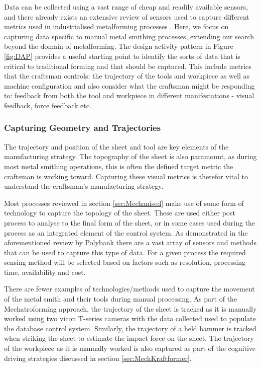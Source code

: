 Data can be collected using a vast range of cheap and readily available sensors, and there already exists an extensive review of sensors used to capture different metrics used in industrialised metalforming processes \citep{Allwood2016Closed-loopForming}. Here, we focus on capturing data specific to manual metal smithing processes, extending our search beyond the domain of metalforming. The design activity pattern in Figure \ref{fig:DAP} provides a useful starting point to identify the sorts of data that is critical to traditional forming and that should be captured. This include metrics that the craftsman controls: the trajectory of the tools and workpiece as well as machine configuration and also consider what the craftsman might be responding to: feedback from both the tool and workpiece in different manifestations - visual feedback, force feedback etc. 

\subsubsection{Capturing Geometry and Trajectories}
The trajectory and position of the sheet and tool are key elements of the manufacturing strategy. The topography of the sheet is also paramount, as during most metal smithing operations, this is often the defined target metric the craftsman is working toward. Capturing these visual metrics is therefor vital to understand the craftsman's manufacturing strategy.

Most processes reviewed in section \ref{sec:Mechanised} make use of some form of technology to capture the topology of the sheet. These are used either post process to analyse to the final form of the sheet, or in some cases used during the process as an integrated element of the control system. As demonstrated in the aforementioned review by Polybank \citep{Allwood2016Closed-loopForming} there are a vast array of sensors and methods that can be used to capture this type of data. For a given process the required sensing method will be selected based on factors such as resolution, processing time, availability and cost. 

There are fewer examples of technologies/methods used to capture the movement of the metal smith and their tools during manual processing. As part of the Mechatroforming approach, the trajectory of the sheet is tracked as it is manually worked  \citep{Ilangovan2016AnForming} using two vicon T-series cameras with the data collected used to populate the database control system. Similarly, the trajectory of a held hammer is tracked when striking the sheet to estimate the impact force on the sheet. The trajectory of the workpiece as it is manually worked is also captured as part of the cognitive driving strategies discussed in section \ref{sec:MechKraftformer}. 


